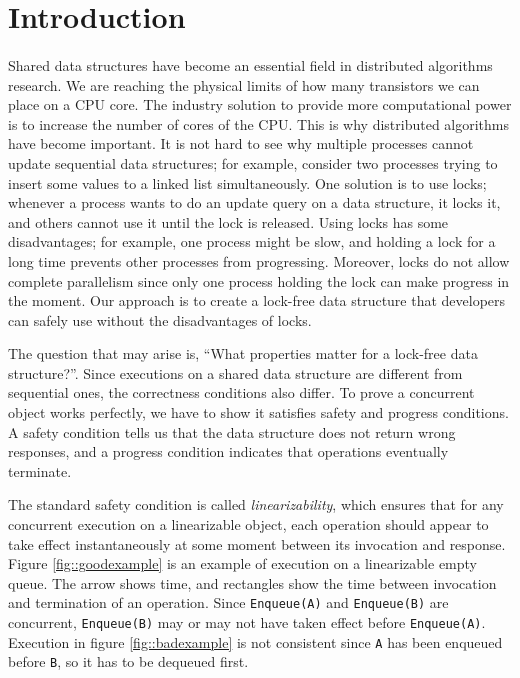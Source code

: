 \documentclass[12pt]{article}
\begin{document}
\pagebreak

\section{Introduction}

\paragraph{}
Shared data structures have become an essential field in distributed algorithms research.
We are reaching the physical limits of how many transistors we can place on a CPU core. The industry solution to provide more computational power is to increase the number of cores of the CPU. This is why distributed algorithms have become important. It is not hard to see why multiple processes cannot update sequential data structures; for example, consider two processes trying to insert some values to a linked list simultaneously. One solution is to use locks; whenever a process wants to do an update query on a data structure, it locks it, and others cannot use it until the lock is released. Using locks has some disadvantages; for example, one process might be slow, and holding a lock for a long time prevents other processes from progressing. Moreover, locks do not allow complete parallelism since only one process holding the lock can make progress in the moment. Our approach is to create a lock-free data structure that developers can safely use without the disadvantages of locks.


The question that may arise is, ``What properties matter for a lock-free data structure?''.
Since executions on a shared data structure are different from sequential ones, the correctness conditions also differ. To prove a concurrent object works perfectly, we have to show it satisfies safety and progress conditions. A safety condition tells us that the data structure does not return wrong responses, and a progress condition indicates that operations eventually terminate.

The standard safety condition is called \textit{linearizability}, which ensures that for any concurrent execution on a linearizable object, each operation should appear to take effect instantaneously at some moment between its invocation and response. Figure \ref{fig::goodexample} is an example of execution on a linearizable empty queue. The arrow shows time, and rectangles show the time between invocation and termination of an operation. Since \texttt{Enqueue(A)} and \texttt{Enqueue(B)} are concurrent, \texttt{Enqueue(B)} may or may not have taken effect before \texttt{Enqueue(A)}. Execution in figure \ref{fig::badexample} is not consistent since \texttt{A} has been enqueued before \texttt{B}, so it has to be dequeued first.
\end{document}
